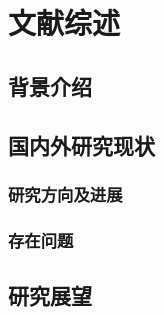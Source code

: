 ﻿\cleardoublepage
\newrefsection

\setlength{\parindent}{2em}
\chapter{文献综述}

\section{背景介绍}

\section{国内外研究现状}

\subsection{研究方向及进展}

\subsection{存在问题}

\section{研究展望}